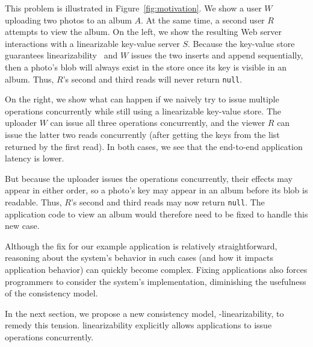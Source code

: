 This problem is illustrated in Figure~\ref{fig:motivation}. We
show a user $W$ uploading two photos to an album $A$. At the same time, a
second user $R$ attempts to view the album. On the left, we show the
resulting Web server interactions with a linearizable key-value server $S$.
Because the key-value store guarantees
linearizability~\cite{herlihy1990linearizability} and $W$ issues the
two inserts and append sequentially, then a photo's blob will
always exist in the store once its key is visible in an album.
Thus, $R$'s second and third reads will never return \texttt{null}.

On the right, we show what can happen if we naively try to issue multiple
operations concurrently while still using a linearizable key-value store.
The uploader $W$ can issue all three operations concurrently, and the
viewer $R$ can issue the latter two reads concurrently (after getting the keys
from the list returned by the first read). In both cases, we see that the
end-to-end application latency is lower.

But because the uploader issues the operations concurrently,
their effects may appear in either order, so a photo's key may appear in an 
album before its blob is readable. Thus, $R$'s second and third reads may now
return \texttt{null}. The application code to view an album would therefore
need to be fixed to handle this new case.

Although the fix for our example application is relatively straightforward,
reasoning about the system's behavior in such cases (and how it impacts application behavior)
can quickly become complex.
Fixing applications also forces programmers to consider the system's implementation,
diminishing the usefulness of the consistency model.

In the next section, we propose a new \multidispatch{} 
consistency model, \md{}-linearizability, to remedy this 
tension. \Multidispatch{} linearizability explicitly allows 
applications to issue operations concurrently.

